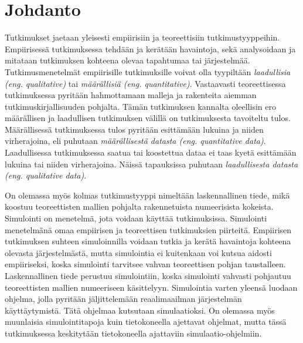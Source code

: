 \documentclass[utf8]{gradu3}
\begin{document}
\author{Jaakko Palm}

\maketitle

\mainmatter

\chapter{Johdanto} \label{johdanto}
Tutkimukset jaetaan yleisesti empiirisiin ja teoreettisiin tutkimustyyppeihin.
Empiirisessä tutkimuksessa tehdään ja kerätään havaintoja, sekä analysoidaan 
ja mitataan tutkimuksen kohteena olevaa tapahtumaa tai järjestelmää. 
Tutkimusmenetelmät empiirisille tutkimuksille voivat olla 
tyypiltään \textit{laadullisia (eng. qualitative)} 
tai \textit{määrällisiä (eng. quantitative)}. 
Vastaavasti teoreettisessa tutkimuksessa pyritään hahmottamaan 
malleja ja rakenteita aiemman tutkimuskirjallisuuden pohjalta. 
Tämän tutkimuksen kannalta oleellisin ero määrällisen ja laadullisen tutkimuksen 
välillä on tutkimuksesta tavoiteltu tulos.
Määrällisessä tutkimuksessa tulos pyritään esittämään lukuina ja niiden virherajoina,
eli puhutaan \textit{määrällisestä datasta (eng. quantitative data)}. 
Laadullisessa tutkimuksessa saatua tai koostettua dataa ei taas kyetä esittämään 
lukuina tai niiden virherajoina. Näissä tapauksissa puhutaan 
\textit{laadullisesta datasta (eng. qualitative data)}.

On olemassa myös kolmas tutkimustyyppi nimeltään laskennallinen tiede, 
mikä koostuu teoreettisten mallien pohjalta rakennetuista numeerisista kokeista. 
Simulointi on menetelmä, jota voidaan käyttää tutkimuksissa.
Simulointi menetelmänä omaa empiirisen ja teoreettisen tutkimuksien piirteitä.
Empiirisen tutkimuksen suhteen simuloinnilla voidaan tutkia ja kerätä havaintoja
kohteena olevasta järjestelmästä, mutta simulointia ei 
kuitenkaan voi kutsua aidosti empiiriseksi,
koska simulointi tarvitsee vahvan teoreettisen pohjan taustalleen.
Laskennallinen tiede perustuu simulointiin, 
koska simulointi vahvasti pohjautuu teoreettisten mallien numeeriseen käsittelyyn.
Simulointia varten yleensä luodaan ohjelma, 
jolla pyritään jäljittelemään reaalimaailman järjestelmän käyttäytymistä.
Tätä ohjelmaa kutsutaan simulaatioksi.
On olemassa myös muunlaisia simulointitapoja kuin tietokoneella ajettavat ohjelmat, mutta 
tässä tutkimuksessa keskitytään tietokoneella ajattaviin simulaatio-ohjelmiin.
\end{document}
